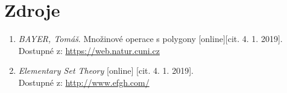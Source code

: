 \documentclass[a4paper, 12pt]{article}
\begin{document}
\section{Zdroje}
\begin{enumerate}
\item  \textsl{BAYER, Tomáš}. Množinové operace s polygony [online][cit. 4. 1. 2019].\\
Dostupné z: \href{https://web.natur.cuni.cz/~bayertom/images/courses/Adk/adk9.pdf}{https://web.natur.cuni.cz}

\item  \textsl{Elementary Set Theory} [online] [cit. 4. 1. 2019].\\
Dostupné z: \href{http://www.efgh.com/math/algebra/sets.htm}{http://www.efgh.com/}
\end{enumerate}
\end{document}
